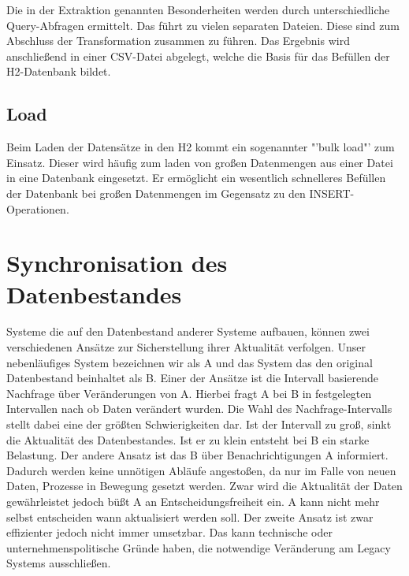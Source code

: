 Die in der Extraktion genannten Besonderheiten werden durch unterschiedliche Query-Abfragen ermittelt. Das führt zu vielen separaten Dateien. Diese sind zum Abschluss der Transformation zusammen zu führen. Das Ergebnis wird anschließend in einer CSV-Datei abgelegt, welche die Basis für das Befüllen der H2-Datenbank bildet. 

\subsection{Load}

Beim Laden der Datensätze in den H2 kommt ein sogenannter "'bulk load"' zum Einsatz. Dieser wird häufig zum laden von großen Datenmengen aus einer Datei in eine Datenbank eingesetzt. Er ermöglicht ein wesentlich schnelleres Befüllen der Datenbank bei großen Datenmengen im Gegensatz zu den INSERT-Operationen.

\section{Synchronisation des Datenbestandes}

Systeme die auf den Datenbestand anderer Systeme aufbauen, können zwei verschiedenen Ansätze zur Sicherstellung ihrer Aktualität verfolgen. Unser nebenläufiges System bezeichnen wir als A und das System das den original Datenbestand beinhaltet als B. Einer der Ansätze ist die Intervall basierende Nachfrage über Veränderungen von A. Hierbei fragt A bei B in festgelegten Intervallen nach ob Daten verändert wurden. Die Wahl des Nachfrage-Intervalls stellt dabei eine der größten Schwierigkeiten dar. Ist der Intervall zu groß, sinkt die Aktualität des Datenbestandes. Ist er zu klein entsteht bei B ein starke Belastung. Der andere Ansatz ist das B über Benachrichtigungen A informiert. Dadurch werden keine unnötigen Abläufe angestoßen, da nur im Falle von neuen Daten, Prozesse in Bewegung gesetzt werden. Zwar wird die Aktualität der Daten gewährleistet jedoch büßt A an Entscheidungsfreiheit ein. A kann nicht mehr selbst entscheiden wann aktualisiert werden soll. Der zweite Ansatz ist zwar effizienter jedoch nicht immer umsetzbar. Das kann technische oder unternehmenspolitische Gründe haben, die notwendige Veränderung am Legacy Systems ausschließen.  

